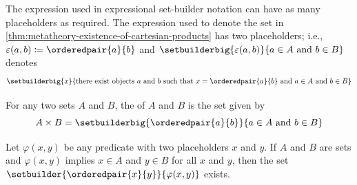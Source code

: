 
\begin{rem}
    The expression used in expressional set-builder notation can have as many placeholders as required.
    The expression used to denote the set in \cref{thm:metatheory-existence-of-cartesian-products} has two placeholders;
    i.e., \( \varepsilon(a, b) \coloneq \orderedpair{a}{b} \) and \(  \setbuilderbig{\varepsilon(a, b)}{a \in A \ \text{and} \ b \in B} \) denotes
    \begin{equation*}
        \setbuilderbig{x}{\text{there exist objects \( a \) and \( b \) such that \( x = \orderedpair{a}{b} \) and \( a \in A \) and \( b \in B \)}}
    \end{equation*}
\end{rem}

\begin{dfn}
     \label{dfn:metatheory-cartesian-product}
    For any two sets \( A \) and \( B \), the  of \( A \) and \( B \) is the set given by
    \begin{equation*}
        A \times B = \setbuilderbig{\orderedpair{a}{b}}{a \in A \ \text{and} \ b \in B}
    \end{equation*}
\end{dfn}

\begin{thm}
     \label{thm:metatheory-existence-of-ordered-pairs-satisfying-binary-predicates}
    Let \( \varphi(x, y) \) be any predicate with two placeholders \( x \) and \( y \).
    If \( A \) and \( B \) are sets and \( \varphi(x, y) \) implies \( x \in A \) and \( y \in B \) for all \( x \) and \( y \),
    then the set \( \setbuilder{\orderedpair{x}{y}}{\varphi(x, y)} \) exists.
\end{thm}

